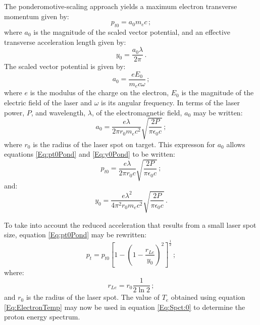 The ponderomotive-scaling approach yields a maximum electron
transverse momentum given by:
\begin{equation}
  p_{t0} = a_0 m_e c \, ;
  \label{Eq:pt0Pond}
\end{equation}
where $a_0$ is the magnitude of the scaled vector potential, and an
effective transverse acceleration length given by:
\begin{equation}
  y_0 = \frac{a_0 \lambda}{2\pi} \, .
  \label{Eq:y0Pond}
\end{equation}
The scaled vector potential is given by:
\begin{equation}
  a_0 = \frac{e E_0}{m_e c \omega} \, ;
\end{equation}
where $e$ is the modulus of the charge on the electron, $E_0$ is the
magnitude of the electric field of the laser and $\omega$ is its 
angular frequency.
In terms of the laser power, $P$, and wavelength, $\lambda$, of the
electromagnetic field, $a_0$ may be written:
\begin{equation}
  a_0 = \frac{e \lambda}{2\pi r_0 m_e c^2}
           \sqrt{\frac{2 P}{\pi \epsilon_0 c}} \, ;
\end{equation}
where $r_0$ is the radius of the laser spot on target.
This expresson for $a_0$ allows equations \ref{Eq:pt0Pond}
and \ref{Eq:y0Pond} to be written:
\begin{equation}
  p_{t0} = \frac{e \lambda}{2\pi r_0 c} 
           \sqrt{\frac{2 P}{\pi \epsilon_0 c}} \, ;
  \label{Eq:pt0Pond1}
\end{equation}
and:
\begin{equation}
  y_0 = \frac{e \lambda^2}{4\pi^2 r_0 m_e c^2} 
           \sqrt{\frac{2 P}{\pi \epsilon_0 c}} \, .
  \label{Eq:y0Pond1}
\end{equation}

To take into account the reduced acceleration that results from a
small laser spot size, equation \ref{Eq:pt0Pond} may be rewritten:
\begin{equation}
  p_t = p_{t0} \left[
                1 - \left(
                      1 - \frac{r_{Le}}{y_0}
                    \right)^2
              \right]^\frac{1}{2} \, ;
\end{equation}
where:
\begin{equation}
  r_{Le} = r_0 \frac{1}{2 \ln 2} \, ;
\end{equation}
and $r_0$ is the radius of the laser spot.
The value of $T_e$ obtained using equation \ref{Eq:ElectronTemp} may
now be used in equation \ref{Eq:Spct:0} to determine the proton energy
spectrum.


